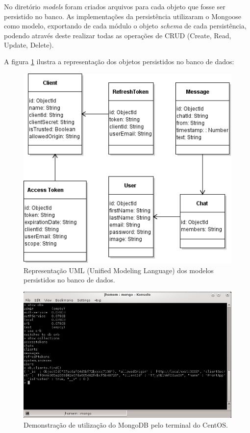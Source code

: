 No diretório \textit{models} foram criados arquivos para cada objeto que fosse ser persistido no banco. As implementações da persistência utilizaram o Mongoose como modelo, exportando de cada módulo o objeto \textit{schema} de cada persistência, podendo através deste realizar todas as operações de CRUD (Create, Read, Update, Delete).

A figura \ref{fig:modelsuml} ilustra a representação dos objetos persistidos no banco de dados:

\begin{figure}[!h]
	\centering
	\includegraphics[scale=0.85]{imagens/models_uml.png}
	\caption{\small Representação UML (Unified Modeling Language) dos modelos persistidos no banco de dados.}
	\label{fig:modelsuml}
\end{figure}

\begin{figure}[!h]
	\centering
	\includegraphics[scale=0.60]{imagens/mongo_console.png}
	\caption{\small Demonstração de utilização do MongoDB pelo terminal do CentOS.}
	\label{fig:mongoconsole}
\end{figure}


